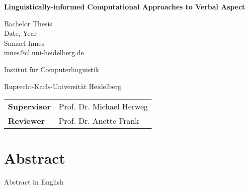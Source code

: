 
\sffamily
{} %
\pagestyle{empty}

\clearscrheadings\clearscrplain



\begin{center}

\begin{Huge}
\vspace{10mm}
\textbf{Linguistically-informed Computational Approaches to Verbal Aspect}
\end{Huge}


\vspace{70mm}
\begin{large}
Bachelor Thesis\\
Date, Year\\

\vspace{1 cm}
Samuel Innes\\
innes@cl.uni-heidelberg.de\\
\end{large}
\vspace{2cm}

\begin{Large}
Institut für Computerlinguistik\\ %
\vspace{3mm}
\end{Large}{\Large Ruprecht-Karls-Universität Heidelberg}\\ %
\vspace{2cm}

\begin{tabular}{ll}
\textbf{Supervisor} & Prof. Dr. Michael Herweg\\
\textbf{Reviewer} & Prof. Dr. Anette Frank\\
\end{tabular}
\end{center}

\clearpage


\pagestyle{useheadings} %

\chapter*{Abstract}\label{c.abstract}
Abstract in English

